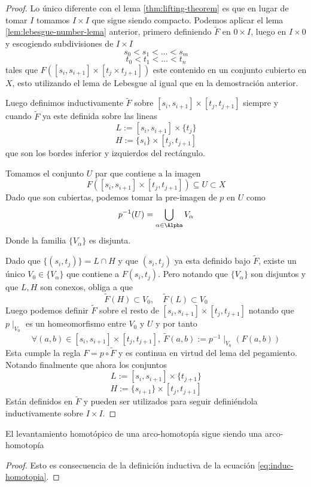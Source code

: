 \begin{proof}
  Lo único diferente con el lema \ref{thm:lifting-theorem} es que en
  lugar de tomar \(I\) tomamos \(I \times I\) que sigue siendo compacto.
  Podemos aplicar el lema \ref{lem:lebesgue-number-lema} anterior, primero
  definiendo \(\tilde F\) en \(0 \times I\), luego en \(I \times 0\) y
  escogiendo subdivisiones de \(I \times I\)
  \[ s_0 < s_1 < \dotsc < s_m \]
  \[ t_0 < t_1 < \dotsc < t_n \]
  tales que \(F ([s_i , s_{i+1}] \times [t_j \times t_{j+1}])\) este
  contenido en un conjunto cubierto en \(X\), esto utilizando
  el lema de Lebesgue al igual que en la demostración anterior.

  Luego definimos inductivamente \(\tilde F\) sobre \([s_i, s_{i+1}]
  \times [t_j , t_{j+1}]\) siempre y cuando \(\tilde F\) ya este
  definida sobre las lineas
  \[ L := [s_i , s_{i+1}] \times \{t_j\}\]
  \[ H := \{s_i\} \times [t_j , t_{j+1}] \]
  que son los bordes inferior y izquierdos del rectángulo.

  Tomamos el conjunto \(U\) par que contiene a la imagen
  \[ F([s_i , s_{i+1}] \times [t_j , t_{j+1}]) \subseteq U \subset X \]
  Dado que son cubiertas, podemos tomar la pre-imagen de \(p\) en \(U\) como
  \[ p^{-1}(U) = \bigcup_{\alpha \in \Alpha} V_\alpha\]
  Donde la familia \(\{V_\alpha\}\) es disjunta.

  Dado que \( \{(s_i, t_j)\} = L \cap H\) y que \( (s_i , t_j) \) ya
  esta definido bajo \(\tilde F\), existe un único \(V_0 \in
  \{V_\alpha\}\) que contiene a \(F (s_i, t_j)\). Pero notando que
  \(\{V_\alpha\}\) son disjuntos y que \(L,H\) son conexos, obliga a que
  \[ \tilde F (H) \subset V_0, \quad \tilde F (L) \subset V_0 \]
  Luego podemos definir \(\tilde F\) sobre el resto de \([s_i,
    s_{i+1}] \times [t_j , t_{j+1}]\) notando que \(p \mid_{V_0}\) es
  un homeomorfismo entre \(V_0\) y \(U\) y por tanto
  \begin{equation}\label{eq:induc-homotopia}
  \forall (a,b) \in [s_i, s_{i+1}] \times [t_j , t_{j+1}],
    \ \tilde F (a,b) := p^{-1} \mid_{V_0} \left( F(a,b) \right)
  \end{equation}
  Esta cumple la regla \( F = p \circ \tilde F\) y es continua en virtud
  del lema del pegamiento. Notando finalmente que ahora los conjuntos
  \[ L := [s_i , s_{i+1}] \times \{t_{j+1}\}\]
  \[ H := \{s_{i+1}\} \times [t_j , t_{j+1}] \]
  Están definidos en \(\tilde F\) y pueden ser utilizados para seguir
  definiéndola inductivamente sobre \(I \times I\).
\end{proof}
\begin{corolario}\label{cor:preservar-arco-hom}
  El levantamiento homotópico de una arco-homotopía sigue siendo una arco-homotopía
\end{corolario}
\begin{proof}
  Esto es consecuencia de la definición inductiva de la ecuación
  \eqref{eq:induc-homotopia}.
\end{proof}

